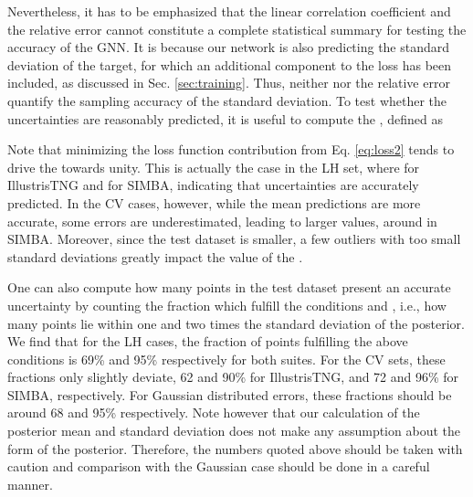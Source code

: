 \documentclass[twocolumn]{aastex631}
\begin{document}
Nevertheless, it has to be emphasized that the linear correlation coefficient  and the relative error cannot constitute a complete statistical summary for testing the accuracy of the GNN. It is because our network is also predicting the standard deviation of the target, for which an additional component to the loss has been included, as discussed in Sec. \ref{sec:training}. Thus, neither  nor the relative error quantify the sampling accuracy of the standard deviation. To test whether the uncertainties are reasonably predicted, it is useful to compute the , defined as

Note that minimizing the loss function contribution from Eq. \ref{eq:loss2} tends to drive the  towards unity. This is actually the case in the LH set, where  for IllustrisTNG and  for SIMBA, indicating that uncertainties are accurately predicted. In the CV cases, however, while the mean predictions are more accurate, some errors are underestimated, leading to larger  values, around  in SIMBA. Moreover, since the test dataset is smaller, a few outliers with too small standard deviations greatly impact the value of the .



One can also compute how many points in the test dataset present an accurate uncertainty by counting the fraction which fulfill the conditions  and , i.e., how many points lie within one and two times the standard deviation of the posterior. We find that for the LH cases, the fraction of points fulfilling the above conditions is 69\% and 95\% respectively for both suites. For the CV sets, these fractions only slightly deviate, 62 and 90\% for IllustrisTNG, and 72 and 96\% for SIMBA, respectively. For Gaussian distributed errors, these fractions should be around 68 and 95\% respectively. Note however that our calculation of the posterior mean and standard deviation does not make any assumption about the form of the posterior. Therefore, the numbers quoted above should be taken with caution and comparison with the Gaussian case should be done in a careful manner.
\end{document}
